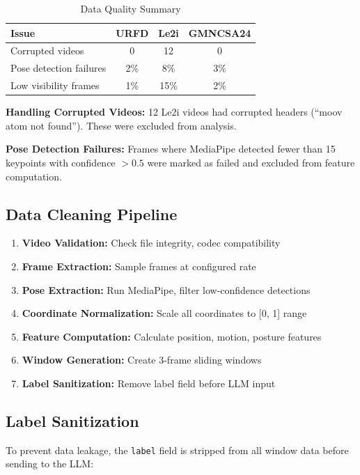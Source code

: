 \documentclass[conference]{IEEEtran}
\begin{document}
\begin{table}[!t]
\centering
\caption{Data Quality Summary}
\label{tab:data_quality}
\begin{tabular}{lccc}
\toprule
\textbf{Issue} & \textbf{URFD} & \textbf{Le2i} & \textbf{GMNCSA24} \\
\midrule
Corrupted videos & 0 & 12 & 0 \\
Pose detection failures & 2\% & 8\% & 3\% \\
Low visibility frames & 1\% & 15\% & 2\% \\
\bottomrule
\end{tabular}
\end{table}

\textbf{Handling Corrupted Videos:} 12 Le2i videos had corrupted headers (``moov atom not found''). These were excluded from analysis.

\textbf{Pose Detection Failures:} Frames where MediaPipe detected fewer than 15 keypoints with confidence $> 0.5$ were marked as failed and excluded from feature computation.

\subsection{Data Cleaning Pipeline}

\begin{enumerate}[leftmargin=*]
    \item \textbf{Video Validation:} Check file integrity, codec compatibility
    \item \textbf{Frame Extraction:} Sample frames at configured rate
    \item \textbf{Pose Extraction:} Run MediaPipe, filter low-confidence detections
    \item \textbf{Coordinate Normalization:} Scale all coordinates to [0, 1] range
    \item \textbf{Feature Computation:} Calculate position, motion, posture features
    \item \textbf{Window Generation:} Create 3-frame sliding windows
    \item \textbf{Label Sanitization:} Remove label field before LLM input
\end{enumerate}

\subsection{Label Sanitization}

To prevent data leakage, the \texttt{label} field is stripped from all window data before sending to the LLM:
\end{document}

